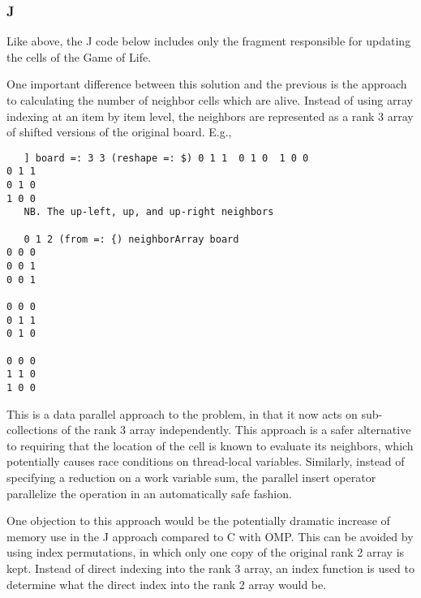 \subsubsection{J}
Like above, the J code below includes only the fragment responsible for updating the cells of the Game of Life. 

\begin{singlespacing}
\begin{small}

\end{small}
\end{singlespacing}

One important difference between this solution and the previous is 
the approach to calculating the number of neighbor cells which are alive.
Instead of using array indexing at an item by item level, 
the neighbors are represented as a rank 3 array of shifted versions of the original board.
E.g.,

\begin{singlespacing}
\begin{small}
\begin{verbatim}
   ] board =: 3 3 (reshape =: $) 0 1 1  0 1 0  1 0 0
0 1 1
0 1 0
1 0 0
   NB. The up-left, up, and up-right neighbors

   0 1 2 (from =: {) neighborArray board 
0 0 0
0 0 1
0 0 1

0 0 0
0 1 1
0 1 0

0 0 0
1 1 0
1 0 0
\end{verbatim}
\end{small}
\end{singlespacing}

This is a data parallel approach to the problem,
in that it now acts on sub-collections of the rank 3 array independently. 
This approach is a safer alternative to requiring 
that the location of the cell is known to evaluate its neighbors, 
which potentially causes race conditions on thread-local variables.
Similarly, instead of specifying a reduction on a work variable \ttfamily sum\normalfont,
the parallel insert operator parallelize the operation in an automatically safe fashion.

One objection to this approach would be the potentially dramatic increase 
of memory use in the J approach compared to C with OMP. 
This can be avoided by using index permutations, %
in which only one copy of the original rank 2 array is kept.
Instead of direct indexing into the rank 3 array, 
an index function is used to determine 
what the direct index into the rank 2 array would be.

